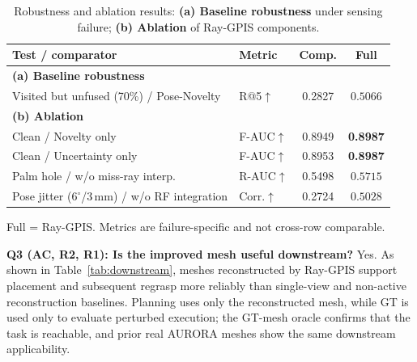 \documentclass[conference]{IEEEtran}
\begin{document}
\begin{table}[t]
\centering
\caption{Robustness and ablation results: \textbf{(a) Baseline robustness}
under sensing failure; \textbf{(b) Ablation} of Ray-GPIS components.}
\label{tab:robust}

\begin{tabularx}{\linewidth}{Xlcc}
\toprule
Test / comparator & Metric & Comp. & \textbf{Full} \\
\midrule

\multicolumn{4}{l}{\textbf{(a) Baseline robustness}} \\
Visited but unfused (70\%) / Pose-Novelty
  & R@5$\uparrow$
  & 0.2827
  & $\mathbf{0.5066}$ \\

\midrule
\multicolumn{4}{l}{\textbf{(b) Ablation}} \\
Clean / Novelty only
  & F-AUC$\uparrow$
  & 0.8949
  & \textbf{0.8987} \\

Clean / Uncertainty only
  & F-AUC$\uparrow$
  & 0.8953
  & \textbf{0.8987} \\

Palm hole / w/o miss-ray interp.
  & R-AUC$\uparrow$
  & 0.5498
  & $\mathbf{0.5715}$ \\

Pose jitter ($6^\circ$/3\,mm) / w/o RF integration
  & Corr.$\uparrow$
  & 0.2724
  & $\mathbf{0.5028}$ \\
\bottomrule
\end{tabularx}

Full = Ray-GPIS. Metrics are failure-specific and not cross-row comparable.

\end{table}

\textbf{Q3 (AC, R2, R1): Is the improved mesh useful downstream?}
Yes. As shown in Table~\ref{tab:downstream}, meshes reconstructed by Ray-GPIS
support placement and subsequent regrasp more reliably than single-view and
non-active reconstruction baselines. Planning uses only the reconstructed
mesh, while GT is used only to evaluate perturbed execution; the GT-mesh
oracle confirms that the task is reachable, and prior real AURORA meshes show
the same downstream applicability.
\end{document}
